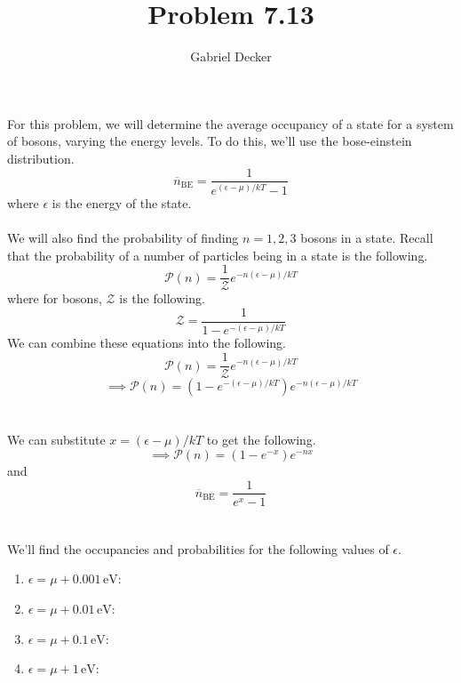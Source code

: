 \documentclass[12pt]{article}
\title{Problem 7.13}
\author{Gabriel Decker}
\begin{document}
\maketitle
\begin{flushleft}


For this problem, we will determine the average occupancy of a state for a system of bosons, varying the energy levels.
To do this, we'll use the bose-einstein distribution.
\begin{equation}
    \overline{n}_\text{BE}=\frac{1}{e^{(\epsilon-\mu)/kT}-1}
\end{equation}
where $\epsilon$ is the energy of the state.\\~\\

We will also find the probability of finding $n=1,2,3$ bosons in a state.
Recall that the probability of a number of particles being in a state is the following.
\begin{equation}
    \mathcal{P}(n)=\frac{1}{\mathcal{Z}}e^{-n(\epsilon-\mu)/kT}
\end{equation}
where for bosons, $\mathcal{Z}$ is the following.
\begin{equation}
    \mathcal{Z}=\frac{1}{1-e^{-(\epsilon-\mu)/kT}}
\end{equation}
We can combine these equations into the following.
$$\mathcal{P}(n)=\frac{1}{\mathcal{Z}}e^{-n(\epsilon-\mu)/kT}$$
$$\implies\mathcal{P}(n)=(1-e^{-(\epsilon-\mu)/kT})e^{-n(\epsilon-\mu)/kT}$$\\~\\

We can substitute $x=(\epsilon-\mu)/kT$ to get the following.
$$\implies\mathcal{P}(n)=(1-e^{-x})e^{-nx}$$
and
$$\overline{n}_\text{BE}=\frac{1}{e^{x}-1}$$\\~\\

We'll find the occupancies and probabilities for the following values of $\epsilon$.
\begin{enumerate}
    \item[a.] $\epsilon=\mu+0.001\,\text{eV}$:\\
    \item[b.] $\epsilon=\mu+0.01\,\text{eV}$:\\
    \item[c.] $\epsilon=\mu+0.1\,\text{eV}$:\\
    \item[d.] $\epsilon=\mu+1\,\text{eV}$:\\
\end{enumerate}


\end{flushleft}
\end{document}
